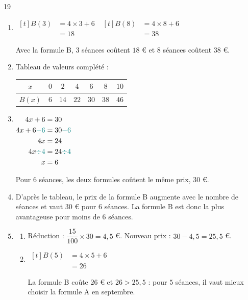 \documentclass[10pt,a4paper]{article}
\begin{document}
\begin{corr}{19}
\begin{enumerate}[leftmargin=*]
    \item \(\begin{aligned}[t] B(3)&=4\times 3+6\\ &=18\end{aligned}\) \qquad \(\begin{aligned}[t] B(8)&=4\times 8+6\\ &=38\end{aligned}\)

    Avec la formule B, \(3\) séances coûtent \(18\) \euro{} et \(8\) séances coûtent \(38\) \euro.
    \item Tableau de valeurs complété :
    \begin{center}
    \renewcommand{\arraystretch}{1.5}
    \begin{tabular}{|*{7}{c|}}
        \hline
        \(x\) & \(0\) & \(2\) & \(4\) & \(6\) & \(8\) & \(10\) \\ \hline
        \(B(x)\) & \(6\) & \(14\) & \(22\) & \(30\) & \(38\) & \(46\) \\ \hline
    \end{tabular}
    \end{center}
    \item
    \(\begin{aligned}[t]
    4x+6 &= 30\\
    4x+6\textcolor{teal}{-6} &= 30\textcolor{teal}{-6}\\
    4x &= 24\\
    4x\textcolor{teal}{\div 4} &= 24\textcolor{teal}{\div 4}\\
    x &= 6
    \end{aligned}\)

    Pour \(6\) séances, les deux formules coûtent le même prix, \(30\) \euro.
    \item D'après le tableau, le prix de la formule B augmente avec le nombre de séances et vaut \(30\) \euro{} pour \(6\) séances. La formule B est donc la plus avantageuse pour moins de \(6\) séances.
    \item \begin{enumerate}
        \item Réduction : \(\dfrac{15}{100}\times 30=4,5\) \euro. Nouveau prix : \(30-4,5=25,5\) \euro.
        \item \(\begin{aligned}[t] B(5)&=4\times 5+6\\ &=26\end{aligned}\)

    La formule B coûte \(26\) \euro{} et \(26>25,5\) : pour \(5\) séances, il vaut mieux choisir la formule A en septembre.
    \end{enumerate}
\end{enumerate}
\end{corr}
\end{document}
